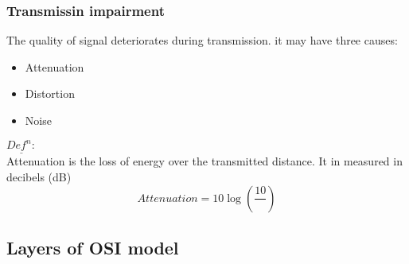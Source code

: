 \documentclass[11pt,letterpaper]{article}
\newenvironment{definition}
	{\begin{mdframed}$\underline{\textit{Def}^\textit{n}:} $\\}
	{\end{mdframed}}
\begin{document}
\subsubsection{Transmissin impairment}
The quality of signal deteriorates during transmission. it may have three causes:
\begin{itemize}
  \item Attenuation
  \item Distortion
  \item Noise
\end{itemize}

\begin{definition}
   Attenuation is the loss of energy over the transmitted distance. It in measured in decibels (dB)
   \[
     Attenuation = 10 \log(\frac{10}{})
   \]
\end{definition}
\subsection{Layers of OSI model}
\end{document}
